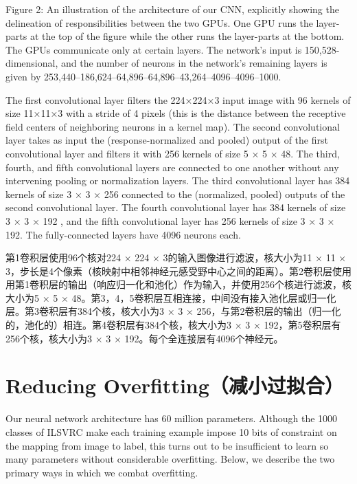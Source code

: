 \documentclass[12pt,a4paper,UTF8,twoside]{book}
\begin{document}
Figure 2: An illustration of the architecture of our CNN, explicitly showing the delineation of responsibilities between the two GPUs. One GPU runs the layer-parts at the top of the figure while the other runs the layer-parts at the bottom. The GPUs communicate only at certain layers. The network's input is 150,528-dimensional, and the number of neurons in the network's remaining layers is given by 253,440--186,624--64,896--64,896--43,264--4096--4096--1000.

The first convolutional layer filters the 224×224×3 input image with 96 kernels of size 11×11×3 with a stride of 4 pixels (this is the distance between the receptive field centers of neighboring neurons in a kernel map). The second convolutional layer takes as input the (response-normalized and pooled) output of the first convolutional layer and filters it with 256 kernels of size 5 × 5 × 48. The third, fourth, and fifth convolutional layers are connected to one another without any intervening pooling or normalization layers. The third convolutional layer has 384 kernels of size 3 × 3 × 256 connected to the (normalized, pooled) outputs of the second convolutional layer. The fourth convolutional layer has 384 kernels of size 3 × 3 × 192 , and the fifth convolutional layer has 256 kernels of size 3 × 3 × 192. The fully-connected layers have 4096 neurons each.

第1卷积层使用96个核对224 × 224 × 3的输入图像进行滤波，核大小为11 × 11 × 3，步长是4个像素（核映射中相邻神经元感受野中心之间的距离）。第2卷积层使用用第1卷积层的输出（响应归一化和池化）作为输入，并使用256个核进行滤波，核大小为5 × 5 × 48。第3，4，5卷积层互相连接，中间没有接入池化层或归一化层。第3卷积层有384个核，核大小为3 × 3 × 256，与第2卷积层的输出（归一化的，池化的）相连。第4卷积层有384个核，核大小为3 × 3 × 192，第5卷积层有256个核，核大小为3 × 3 × 192。每个全连接层有4096个神经元。

\hypertarget{reducing-overfittingux51cfux5c0fux8fc7ux62dfux5408}{%
\section{Reducing Overfitting（减小过拟合）}\label{reducing-overfittingux51cfux5c0fux8fc7ux62dfux5408}}

Our neural network architecture has 60 million parameters. Although the 1000 classes of ILSVRC make each training example impose 10 bits of constraint on the mapping from image to label, this turns out to be insufficient to learn so many parameters without considerable overfitting. Below, we describe the two primary ways in which we combat overfitting.
\end{document}
